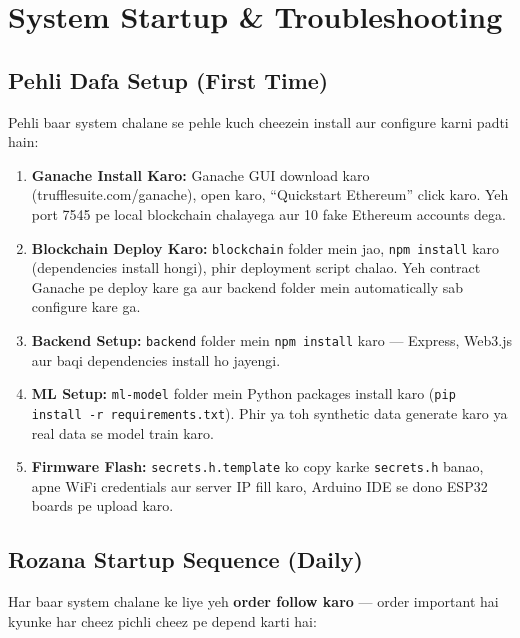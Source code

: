 \chapter{System Startup \& Troubleshooting}

\section{Pehli Dafa Setup (First Time)}

Pehli baar system chalane se pehle kuch cheezein install aur configure karni padti hain:

\begin{enumerate}
    \item \textbf{Ganache Install Karo:} Ganache GUI download karo (trufflesuite.com/ganache), open karo, ``Quickstart Ethereum'' click karo. Yeh port 7545 pe local blockchain chalayega aur 10 fake Ethereum accounts dega.
    
    \item \textbf{Blockchain Deploy Karo:} \texttt{blockchain} folder mein jao, \texttt{npm install} karo (dependencies install hongi), phir deployment script chalao. Yeh contract Ganache pe deploy kare ga aur backend folder mein automatically sab configure kare ga.
    
    \item \textbf{Backend Setup:} \texttt{backend} folder mein \texttt{npm install} karo --- Express, Web3.js aur baqi dependencies install ho jayengi.
    
    \item \textbf{ML Setup:} \texttt{ml-model} folder mein Python packages install karo (\texttt{pip install -r requirements.txt}). Phir ya toh synthetic data generate karo ya real data se model train karo.
    
    \item \textbf{Firmware Flash:} \texttt{secrets.h.template} ko copy karke \texttt{secrets.h} banao, apne WiFi credentials aur server IP fill karo, Arduino IDE se dono ESP32 boards pe upload karo.
\end{enumerate}

\section{Rozana Startup Sequence (Daily)}

Har baar system chalane ke liye yeh \textbf{order follow karo} --- order important hai kyunke har cheez pichli cheez pe depend karti hai:

